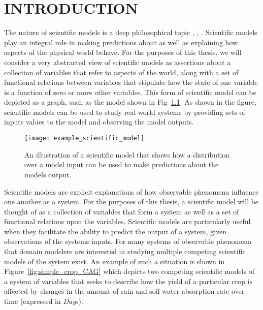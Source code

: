 \chapter{INTRODUCTION\label{chapter:introduction}}
The nature of scientific models is a deep philosophical topic \citep{giere2010explaining}, \citep{morrison2009models}, \citep{frigg2006models}.
Scientific models play an integral role in making predictions about as well as explaining how aspects of the physical world behave.
For the purposes of this thesis, we will consider a very abstracted view of scientific models as assertions about a collection of variables that refer to aspects of the world, along with a set of functional relations between variables that stipulate how the state of one variable is a function of zero or more other variables.
This form of scientific model can be depicted as a graph, such as the model shown in Fig~\ref{fig:example_sci_model}.
As shown in the figure, scientific models can be used to study real-world systems by providing sets of inputs values to the model and observing the model outputs.

\begin{figure}[!htbp]
  \label{fig:example_sci_model}
  \centering
  \texttt{[image: example\_scientific\_model]}
  \caption[An Example of a Scientific Model]{An illustration of a scientific model that shows how a distribution over a model input can be used to make predictions about the models output.}
\end{figure}


Scientific models are explicit explanations of how observable phenomena influence one another as a system.
For the purposes of this thesis, a scientific model will be thought of as a collection of variables that form a system as well as a set of functional relations upon the variables.
Scientific models are particularly useful when they facilitate the ability to predict the output of a system, given observations of the systems inputs.
For many systems of observable phenomena that domain modelers are interested in studying multiple competing scientific models of the system exist.
An example of such a situation is shown in Figure~\ref{fig:simple_crop_CAG} which depicts two competing scientific models of a system of variables that seeks to describe how the yield of a particular crop is affected by changes in the amount of rain and soil water absorption rate over time (expressed in \emph{Day}s).

